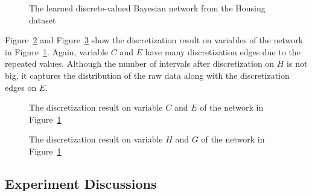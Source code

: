 \begin{figure}[ht]
      
  \caption{The learned discrete-valued Bayesian network from the Housing dataset
  }
  \label{fig:housing_graph_2}
\end{figure}

Figure~\ref{fig:housing_exp2_distr_3_5} and Figure~\ref{fig:housing_exp2_distr_8_5} show the discretization result on variables of the network in Figure~\ref{fig:housing_graph_2}.
Again, variable $C$ and $E$ have many discretization edges due to the repeated values.
Although the number of intervals after discretization on $H$ is not big, it captures the distribution of the raw data along with the discretization edges on $E$.

\begin{figure}[ht]
      
  \caption{The discretization result on variable $C$ and $E$ of the network in Figure~\ref{fig:housing_graph_2}}
  \label{fig:housing_exp2_distr_3_5}
\end{figure}

\begin{figure}[ht]
      
  \caption{The discretization result on variable $H$ and $G$ of the network in Figure~\ref{fig:housing_graph_2}}
  \label{fig:housing_exp2_distr_8_5}
\end{figure}

\subsection{Experiment Discussions}
\label{subsec:discuss_exp}



